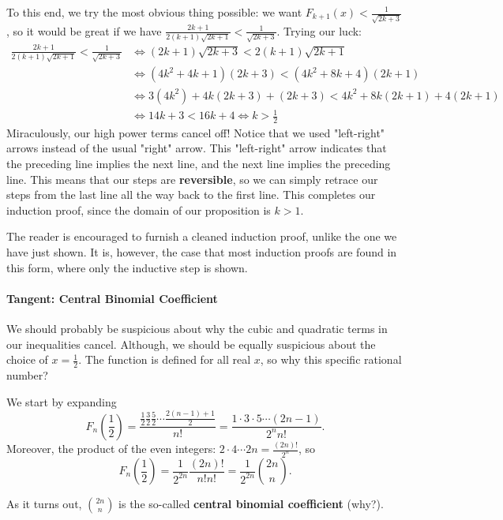 \documentclass[../main.tex]{subfiles}
\begin{document}
    To this end, we try the most obvious thing possible: we want $F_{k+1}(x) < \frac{1}{\sqrt{2k+3}}$, so it would be great if we have $\frac{2k+1}{2(k+1)\sqrt{2k+1}}<\frac{1}{\sqrt{2k+3}}$. Trying our luck:
    \begin{align*}
        \frac{2k+1}{2(k+1)\sqrt{2k+1}} < \frac{1}{\sqrt{2k+3}}
        &\Longleftrightarrow (2k+1)\sqrt{2k+3} < 2(k+1)\sqrt{2k+1} \\
        &\Longleftrightarrow (4k^2+4k+1)(2k+3) < (4k^2+8k+4)(2k+1) \\
        &\Longleftrightarrow 3(4k^2)+4k(2k+3)+(2k+3) < 4k^2+8k(2k+1)+4(2k+1) \\
        &\Longleftrightarrow 14k+3 < 16k+4 \Longleftrightarrow k > \frac{1}{2}
    \end{align*}
    Miraculously, our high power terms cancel off! Notice that we used "left-right" arrows instead of the usual "right" arrow. This "left-right" arrow indicates that the preceding line implies the next line, and the next line implies the preceding line. This means that our steps are \textbf{reversible}, so we can simply retrace our steps from the last line all the way back to the first line. This completes our induction proof, since the domain of our proposition is $k > 1$.

    The reader is encouraged to furnish a cleaned induction proof, unlike the one we have just shown. It is, however, the case that most induction proofs are found in this form, where only the inductive step is shown.
    \paragraph{Tangent: Central Binomial Coefficient}\label{algebra-cbc}
    We should probably be suspicious about why the cubic and quadratic terms in our inequalities cancel. Although, we should be equally suspicious about the choice of $x=\frac{1}{2}$. The function is defined for all real $x$, so why this specific rational number?
    
    We start by expanding $$F_n\left(\frac{1}{2}\right)=\frac{\frac{1}{2}\frac{3}{2}\frac{5}{2}\cdots\frac{2(n-1)+1}{2}}{n!}=\frac{1\cdot3\cdot5\cdots(2n-1)}{2^nn!}.$$
    Moreover, the product of the even integers: $2\cdot4\cdots2n=\frac{(2n)!}{2^n}$, so $$F_n\left(\frac{1}{2}\right)=\frac{1}{2^{2n}}\frac{(2n)!}{n!n!}=\frac{1}{2^{2n}}\binom{2n}{n}.$$
    
    As it turns out, $\binom{2n}{n}$ is the so-called \textbf{central binomial coefficient} (why?).
    
\end{document}
